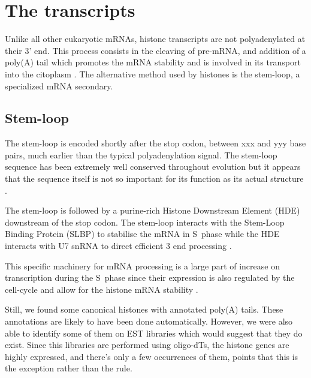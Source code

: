 \section{The transcripts}
  Unlike all other eukaryotic mRNAs, histone transcripts are not polyadenylated at
  their 3' end. This process consists in the cleaving of pre-mRNA, and addition of a
  poly(A) tail which promotes the mRNA stability and is involved in its transport
  into the citoplasm \citep{mRNA-end-processing}. The alternative method used by
  histones is the stem-loop, a specialized mRNA secondary.

  \subsection{Stem-loop}
    The stem-loop is encoded shortly after the stop codon, between xxx and yyy base
    pairs, much earlier than the typical polyadenylation signal. The stem-loop sequence
    has been extremely well conserved throughout evolution but it appears that the
    sequence itself is not so important for its function as its actual structure
    \citep{stem-loop-structure}.


    The stem-loop is followed by a purine-rich Histone Downstream Element (HDE)
    downstream of the stop codon. The stem-loop interacts with the Stem-Loop
    Binding Protein (SLBP) to stabilise the mRNA in S~phase \citep{SLBP-regulation}
    while the HDE interacts with U7 snRNA to direct efficient 3 end processing
    \citep{HDE-sequence}.


    This specific machinery for mRNA processing is a large part of increase on
    transcription during the S~phase since their expression is also regulated
    by the cell-cycle \addref and allow for the histone mRNA stability \addref.

    Still, we found some canonical histones with annotated poly(A) tails. These annotations
    are likely to have been done automatically. However, we were also able to identify
    some of them on EST libraries which would suggest that they do exist. Since
    this libraries are performed using oligo-dTs, the histone genes are highly
    expressed, and there's only a few occurrences of them, points that this is
    the exception rather than the rule.


